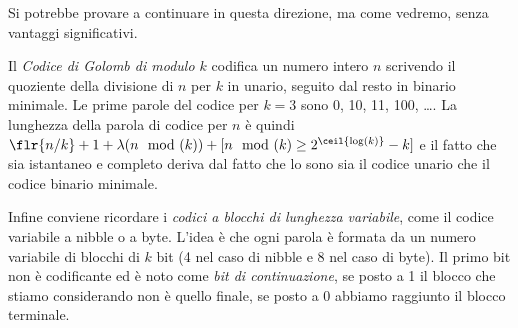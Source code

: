 Si potrebbe provare a continuare in questa direzione, ma come vedremo, senza vantaggi significativi.

Il \textit{Codice di Golomb di modulo $k$} \cite{golomb} codifica un numero intero $n$ scrivendo il quoziente della divisione di $n$ per $k$ in unario, seguito dal resto in binario minimale. Le prime parole del codice per $k = 3$ sono 0, 10, 11, 100, \dots. La lunghezza della parola di codice per $n$ è quindi $\flr{n/k} + 1 + \lambda(n\mod(k)) + [n\mod(k) \geq 2^{\ceil{\log(k)}} - k]$ e il fatto che sia istantaneo e completo deriva dal fatto che lo sono sia il codice unario che il codice binario minimale.

Infine conviene ricordare i \textit{codici a blocchi di lunghezza variabile}, come il codice variabile a nibble o a byte. L'idea è che ogni parola è formata da un numero variabile di blocchi di $k$ bit (4 nel caso di nibble e 8 nel caso di byte). Il primo bit non è codificante ed è noto come \textit{bit di continuazione}, se posto a 1 il blocco che stiamo considerando non è quello finale, se posto a 0 abbiamo raggiunto il blocco terminale.

